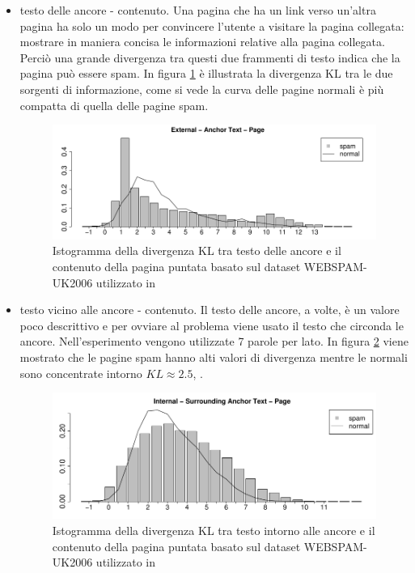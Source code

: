 \begin{itemize}
\item testo delle ancore - contenuto. Una pagina che ha un link verso un'altra pagina ha solo un modo per convincere l'utente a visitare la pagina collegata: mostrare in maniera concisa le informazioni relative alla pagina collegata. Perciò una grande divergenza tra questi due frammenti di testo indica che la pagina può essere spam. In figura \ref{fig:martinez1} è illustrata la divergenza KL tra le due sorgenti di informazione, come si vede la curva delle pagine normali è più compatta di quella delle pagine spam.
\begin{figure}[htbp]
\centering
\includegraphics[width=12cm]{immagini/martinez/martinez1}
\caption{Istogramma della divergenza KL tra testo delle ancore e il contenuto della pagina puntata basato sul dataset WEBSPAM-UK2006 utilizzato in \cite{Martinez-Romo:2009:WSI:1531914.1531920}}
\label{fig:martinez1}
\end{figure}

\item testo vicino alle ancore - contenuto. Il testo delle ancore, a volte, è un valore poco descrittivo e per ovviare al problema viene usato il testo che circonda le ancore. Nell'esperimento vengono utilizzate 7 parole per lato. In figura \ref{fig:martinez2} viene mostrato che le pagine spam hanno alti valori di divergenza mentre le normali sono concentrate intorno \(KL \approx  2.5\), .
\begin{figure}[htbp]
\centering
\includegraphics[width=12cm]{immagini/martinez/martinez2}
\caption{Istogramma della divergenza KL tra testo intorno alle ancore e il contenuto della pagina puntata basato sul dataset WEBSPAM-UK2006 utilizzato in \cite{Martinez-Romo:2009:WSI:1531914.1531920}}
\label{fig:martinez2}
\end{figure}


\end{itemize}
